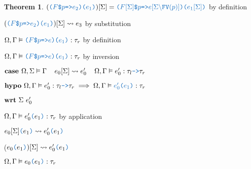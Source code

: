 \documentclass[acmsmall]{acmart}
\theoremstyle{definition}
\newtheorem{theorem}{Theorem}[section]
\begin{document}
\begin{theorem}
        \item \Z\Z\Z $(\obj{($F$\$$p$=>$e_2$)($e_1$)})[\Sigma] = \obj{($F[\Sigma]$\$$p$=>$e[\Sigma\backslash\text{FV}(p)]$)($e_1[\Sigma]$)}
        $ by definition
        \item \Z\Z\Z $(\obj{($F$\$$p$=>$e_2$)($e_1$)})[\Sigma] \rightsquigarrow e_3$ by substitution 

        \item \Z\Z\Z $\Omega, \Gamma \satisfies \obj{($F$\$$p$=>$e$)($e_1$)} \hastype \tau_r$ by definition
      \item \Z\Z $\Omega, \Gamma \satisfies \obj{($F$\$$p$=>$e$)($e_1$)} \hastype \tau_r$ by inversion 


    \item \Z $\B{case }
      \Omega, \Sigma \satisfies \Gamma
      \I
      e_0[\Sigma] \rightsquigarrow e_0'
      \I
      \Omega, \Gamma \satisfies e_0' \hastype \tau_l \obj{->} \tau_r
    $
    \item \Z $\B{hypo}\ 
      \Omega, \Gamma \satisfies e_0' \hastype \tau_l \obj{->} \tau_r
      \implies
      \Omega, \Gamma \satisfies \obj{$e_0'$($e_1$)} \hastype \tau_r
    $
    \item \Z $ 
    \textbf{wrt}\ \Sigma\ e_0' 
    $
      \item \Z\Z $\Omega, \Gamma \satisfies e_0'\obj{(}e_1\obj{)} \hastype \tau_r$ by application 
      \item \Z\Z $e_0[\Sigma]\obj{(}e_1\obj{)} \rightsquigarrow e_0'\obj{(}e_1\obj{)}$
      \item \Z\Z ($e_0\obj{(}e_1\obj{)})[\Sigma] \rightsquigarrow e_0'\obj{(}e_1\obj{)}$
      \item \Z\Z $\Omega, \Gamma \satisfies e_0\obj{(}e_1\obj{)} \hastype \tau_r$ 


\end{theorem}
\end{document}
